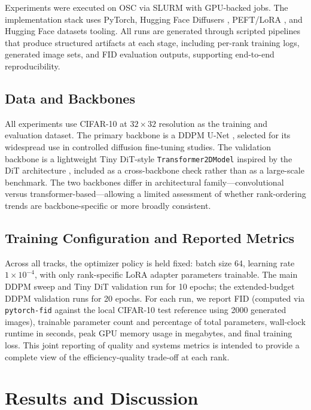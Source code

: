 \documentclass[pdflatex,sn-mathphys-num]{Springer_format/sn-jnl}
\begin{document}
  Experiments were executed on OSC via SLURM with GPU-backed jobs. The implementation stack
  uses PyTorch, Hugging Face Diffusers \cite{vonplaten2022diffusers}, PEFT/LoRA
  \cite{hu2022lora}, and Hugging Face datasets tooling. All runs are generated through
  scripted pipelines that produce structured artifacts at each stage, including per-rank
  training logs, generated image sets, and FID evaluation outputs, supporting end-to-end
  reproducibility.
  
  \subsection{Data and Backbones}
  
  All experiments use CIFAR-10 \cite{krizhevsky2009cifar} at $32 \times 32$ resolution as
  the training and evaluation dataset. The primary backbone is a DDPM U-Net
  \cite{ho2020ddpm}, selected for its widespread use in controlled diffusion fine-tuning
  studies. The validation backbone is a lightweight Tiny DiT-style
  \texttt{Transformer2DModel} inspired by the DiT architecture \cite{peebles2023dit},
  included as a cross-backbone check rather than as a large-scale benchmark. The two
  backbones differ in architectural family---convolutional versus transformer-based---allowing
  a limited assessment of whether rank-ordering trends are backbone-specific or more broadly
  consistent.
  
  \subsection{Training Configuration and Reported Metrics}
  
  Across all tracks, the optimizer policy is held fixed: batch size 64, learning rate
  $1 \times 10^{-4}$, with only rank-specific LoRA adapter parameters trainable. The main
  DDPM sweep and Tiny DiT validation run for 10 epochs; the extended-budget DDPM validation
  runs for 20 epochs. For each run, we report FID (computed via \texttt{pytorch-fid} against
  the local CIFAR-10 test reference using 2000 generated images), trainable parameter count
  and percentage of total parameters, wall-clock runtime in seconds, peak GPU memory usage
  in megabytes, and final training loss. This joint reporting of quality and systems metrics
  is intended to provide a complete view of the efficiency-quality trade-off at each rank.
  
  \section{Results and Discussion}
  \label{sec:results}
  
\end{document}
